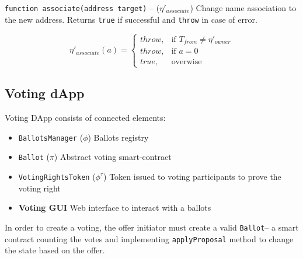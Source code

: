 \documentclass[12pt]{report}
\newcommand{\hlc}[1]{\colorbox{yellow!25}{#1}}
\def\code#1{\colorbox{light-gray}{\texttt{#1}}}
\begin{document}
\code{function associate(address target)} – ($\eta'_{associate}$)\hfill\null\linebreak
Change name association to the new address. Returns \code{true} if successful and \code{throw} in case of error.
 
\begin{equation}
\eta'_{associate}(a) = \begin{cases}
	throw, & \text{if } T_{from} \neq \eta'_{owner} \\
	throw, & \text{if } a = 0 \\
	true, & \text{overwise}
\end{cases}
\end{equation}

\subsection{Voting dApp}
\label{tech-apps-voting}
\begin{multicols}{2}
Voting DApp consists of connected elements:
\begin{itemize}
	\item \code{BallotsManager} ($\phi$)\hfill\null\linebreak
	Ballots registry
	\item \code{Ballot} ($\pi$)\hfill\null\linebreak
	Abstract voting smart-contract
	\item \code{VotingRightsToken} ($\phi^\tau$) \hfill\null\linebreak
	Token issued to voting participants to prove the voting right
	\item \textbf{Voting \hlc{GUI}}\hfill\null\linebreak
	\hlc{Web interface to interact with a ballots}
\end{itemize}
\vfill\null\columnbreak
In order to create a voting, the offer initiator must create a valid \code{Ballot}– a smart contract counting the votes and implementing \code{applyProposal} method to change the state based on the offer.
 
\end{multicols}
\end{document}
